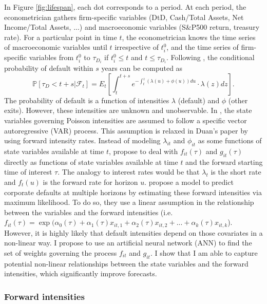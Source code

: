 In Figure \ref{fig:lifespan}, each dot corresponds to a period. At each period, the econometrician gathers firm-specific variables (DtD, Cash/Total Assets, Net Income/Total Assets, ...) and macroeconomic variables (S\&P500 return, treasury rate). For a particular point in time $t$, the econometrician knows the time series of macroeconomic variables until $t$ irrespective of $t_i^0$, and the time series of firm-specific variables from $t_i^0$ to $\tau_{D_i}$ if $t_i^0 \leq t$ and $t \leq \tau_{D_i}$.
Following \citet{DSW}, the conditional probability of default within $s$ years can be computed as 
\begin{equation} \label{eq:3.6}
\mathbb{P}[ \tau_D <t+s |\mathscr{F}_t] = E_t \left[ \int_t^{t+s}  e^{-\int_t^z (\lambda(u)+\phi(u)) du} \cdot \lambda(z) dz \right].
\end{equation}
The probability of default is a function of intensities $\lambda$ (default) and $\phi$ (other exits). However, these intensities are unknown and unobservable. In \citet{DSW}, the state variables governing Poisson intensities are assumed to follow a specific vector autoregressive (VAR) process. This assumption is relaxed in Duan's paper by using forward intensity rates. Instead of modeling $\lambda_{it}$ and $\phi_{it}$ as some functions of state variables available at time $t$, \citet{Duan2012} propose to deal with $f_{it}(\tau)$ and $g_{it}(\tau)$ directly as functions of state variables available at time $t$ and the forward starting time of interest $\tau$. The analogy to interest rates would be that $\lambda_t$ is the short rate and $f_t(u)$ is the forward rate for horizon $u$. \citet{Duan2012} propose a model to predict corporate defaults at multiple horizons by estimating these forward intensities via maximum likelihood. To do so, they use a linear assumption in the relationship between the variables and the forward intensities (i.e. $f_{it}(\tau) = \exp(\alpha_0(\tau) + \alpha_1(\tau) x_{it,1} + \alpha_2(\tau) x_{it,2} + ... + \alpha_k(\tau) x_{it,k}$). However, it is highly likely that default intensities depend on those covariates in a non-linear way. I propose to use an artificial neural network (ANN) to find the set of weights governing the process $f_{it}$ and $g_{it}$. I show that I am able to capture potential non-linear relationships between the state variables and the forward intensities, which significantly improve forecasts.


\subsubsection{Forward intensities}
\label{SSS:2-1-1}

